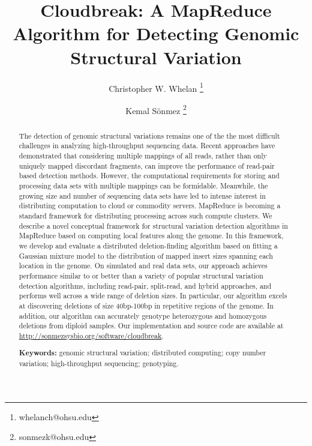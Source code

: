 \documentclass[11pt]{article}
\begin{document}
\title{Cloudbreak: A MapReduce Algorithm for Detecting Genomic Structural Variation}

\author[1,2,4]{Christopher W. Whelan \thanks{whelanch@ohsu.edu}}
\author[1,2,3,4]{Kemal S\"onmez \thanks{sonmezk@ohsu.edu}}


\maketitle

\begin{abstract}
The detection of genomic structural variations remains one of the the most difficult challenges in analyzing high-throughput sequencing data. Recent approaches have demonstrated that considering multiple mappings of all reads, rather than only uniquely mapped discordant fragments, can improve the performance of read-pair based detection methods. However, the computational requirements for storing and processing data sets with multiple mappings can be formidable. Meanwhile, the growing size and number of sequencing data sets have led to intense interest in distributing computation to cloud or commodity servers. MapReduce is becoming a standard framework for distributing processing across such compute clusters. We describe a novel conceptual framework for structural variation detection algorithms in MapReduce based on computing local features along the genome. In this framework, we develop and evaluate a distributed deletion-finding algorithm based on fitting a Gaussian mixture model to the distribution of mapped insert sizes spanning each location in the genome. On simulated and real data sets, our approach achieves performance similar to or better than a variety of popular structural variation detection algorithms, including read-pair, split-read, and hybrid approaches, and performs well across a wide range of deletion sizes. In particular, our algorithm excels at discovering deletions of size 40bp-100bp in repetitive regions of the genome. In addition, our algorithm can accurately genotype heterozygous and homozygous deletions from diploid samples. Our implementation and source code are available at \url{http://sonmezsysbio.org/software/cloudbreak}.

\medskip
\noindent\textbf{Keywords:} genomic structural variation; distributed computing; copy number variation; high-throughput sequencing; genotyping.
\end{abstract}
\end{document}
